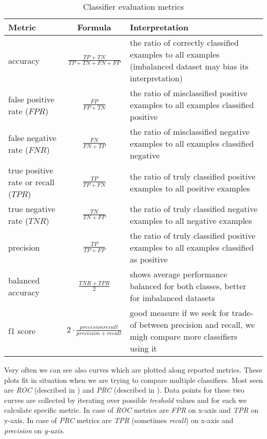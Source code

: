 \begin{table}[h]
    \centering
    \caption{Classifier evaluation metrics}
    \begin{minipage}{\linewidth}
    \begin{tabular}{lcp{5cm}}
      \toprule
      \textbf{Metric} &
      \textbf{Formula} &
      \textbf{Interpretation}
      \\
      \midrule
      accuracy & $\frac{TP+TN}{TP+TN+FN+FP}$ & the ratio of correctly classified examples to all examples (imbalanced dataset may bias its interpretation)\\
      \midrule
      false positive rate ($FPR$) & $\frac{FP}{FP+TN}$ & the ratio of misclassified positive examples to all examples classified positive \\
      \midrule
      false negative rate ($FNR$) & $\frac{FN}{FN+TP}$ &  the ratio of misclassified negative examples to all examples classified negative \\
      \midrule
      true positive rate or recall ($TPR$) & $\frac{TP}{TP+FN}$ & the ratio of truly classified positive examples to all positive examples  \\
      \midrule
      true negative rate ($TNR$) & $\frac{TN}{TN+FP}$ & the ratio of truly classified negative examples to all negative examples \\
      \midrule
      precision & $\frac{TP}{TP+FP}$ & the ratio of truly classified positive examples to all examples classified as positive \\
      \midrule
      balanced accuracy &$\frac{TNR+TPR}{2}$ & shows average performance balanced for both classes, better for imbalanced datasets \\
      \midrule
      f1 score & $2 \cdot \frac{precision \dot recall}{precision+recall}$ & good measure if we seek for trade-of between precision and recall, we migh compare more classifiers using it\\
      \bottomrule
    \end{tabular}
    \end{minipage}
    \label{tab:metrics}
  \end{table}

Very often we can see also curves which are plotted along reported metrics. These plots fit in situation when we are trying to compare multiple classifiers. Most seen are \emph{ROC} (described in \cite{Fawcett2006}) and \emph{PRC} (described in \cite{Flach2015}). Data points for these two curves are collected by iterating over possible \emph{treshold} values and for each we calculate specific metric. In case of \emph{ROC} metrics are \emph{FPR} on x-axis and \emph{TPR} on y-axis. In case of \emph{PRC} metrics are \emph{TPR} (sometimes \emph{recall}) on x-axis and \emph{precision} on \emph{y-axis}.

